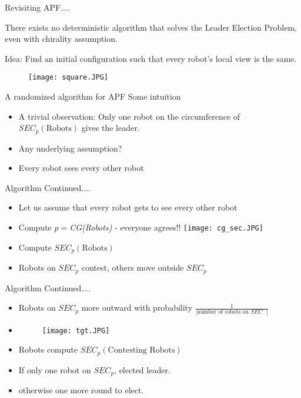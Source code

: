 \documentclass{beamer}
\begin{document}
\begin{frame}{Revisiting APF....}
\begin{theorem}
There exists no deterministic algorithm that solves the Leader Election Problem, even with chirality assumption.
\end{theorem}
\pause
Idea: Find an initial configuration such that every robot's local view is the same. 
\pause
\begin{figure}[ht!]
\centering
\texttt{[image: square.JPG]}
\end{figure}
\end{frame}

\begin{frame}{A randomized algorithm for APF}
Some intuition
\begin{itemize}
\item A trivial observation: Only one robot on the circumference of $SEC_p(\text{Robots})$ gives the leader.
\pause
\item Any underlying assumption?
\pause
\item Every robot sees every other robot
\end{itemize}
\end{frame}

\begin{frame}{Algorithm Continued....}
\begin{itemize}
\item Let us assume that every robot gets to see every other robot
\pause
\item Compute $p=$\emph{CG(Robots)} - everyone agrees!!
\texttt{[image: cg\_sec.JPG]}
\item Compute $SEC_p(\text{Robots})$
\item Robots on $SEC_p$ contest, others move outside $SEC_p$
\end{itemize}
\end{frame}

\begin{frame}{Algorithm Continued....}
\begin{itemize}
\item Robots on $SEC_p$ more outward with probability $\frac{1}{|\text{number of robots on $SEC$ }|}$
\pause
\item \begin{figure}[ht!]
\texttt{[image: tgt.JPG]}
\end{figure}
\pause
\item Robots compute $SEC_p(\text{Contesting Robots})$
\item If only one robot on $SEC_p$, elected leader.
\item otherwise one more round to elect.
\end{itemize}
\end{frame}
\end{document}
